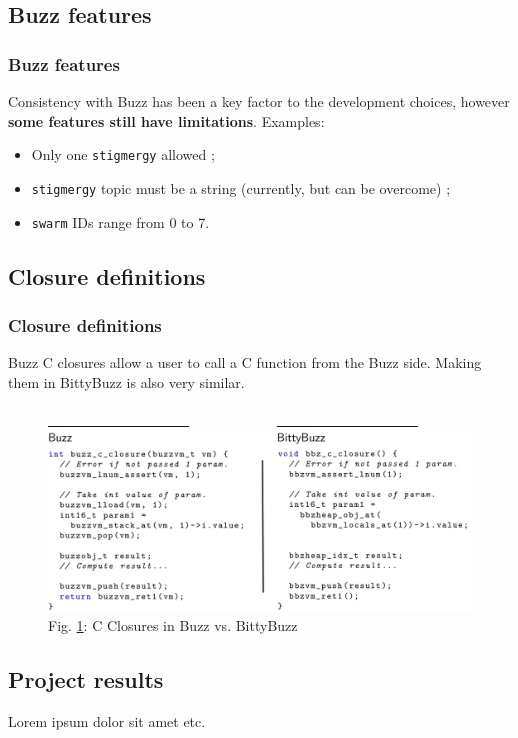 \documentclass{beamer}
\begin{document}
	\begin{frame}
		\subsection{Buzz features}
		\frametitle{Buzz features}
		Consistency with Buzz has been a key factor to the development choices, however \textbf{some features still have limitations}. Examples:
		\begin{itemize}
			\item Only one \texttt{stigmergy} allowed ;
			\item \texttt{stigmergy} topic must be a string (currently, but can be overcome) ;
			\item \texttt{swarm} IDs range from 0 to 7.
		\end{itemize}
	\end{frame}
	\begin{frame}
		\subsection{Closure definitions}
		\frametitle{Closure definitions}
		Buzz C closures allow a user to call a C function from the Buzz side. Making them in BittyBuzz is also very similar.\\
		~\\
		\begin{figure}
			\includegraphics[width=1\textwidth]{ClosureDefinitions}
			\caption{\label{figure:C Closures}Fig. \ref{figure:C Closures}: C Closures in Buzz vs. BittyBuzz}
		\end{figure}
	\end{frame}
	\begin{frame}
		\section{Project results}
		Lorem ipsum dolor sit amet etc.
	\end{frame}
\end{document}
